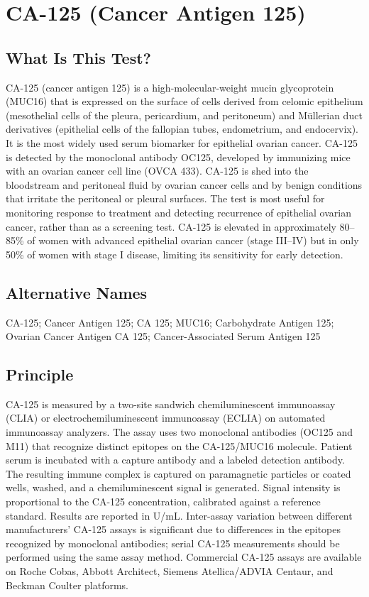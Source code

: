 \chapter{CA-125 (Cancer Antigen 125)}

\section*{What Is This Test?}
CA-125 (cancer antigen 125) is a high-molecular-weight mucin glycoprotein (MUC16) that is expressed on the surface of cells derived from celomic epithelium (mesothelial cells of the pleura, pericardium, and peritoneum) and M\"ullerian duct derivatives (epithelial cells of the fallopian tubes, endometrium, and endocervix). It is the most widely used serum biomarker for epithelial ovarian cancer. CA-125 is detected by the monoclonal antibody OC125, developed by immunizing mice with an ovarian cancer cell line (OVCA 433). CA-125 is shed into the bloodstream and peritoneal fluid by ovarian cancer cells and by benign conditions that irritate the peritoneal or pleural surfaces. The test is most useful for monitoring response to treatment and detecting recurrence of epithelial ovarian cancer, rather than as a screening test. CA-125 is elevated in approximately 80--85\% of women with advanced epithelial ovarian cancer (stage III--IV) but in only 50\% of women with stage I disease, limiting its sensitivity for early detection.

\section*{Alternative Names}
CA-125; Cancer Antigen 125; CA 125; MUC16; Carbohydrate Antigen 125; Ovarian Cancer Antigen CA 125; Cancer-Associated Serum Antigen 125

\section*{Principle}
CA-125 is measured by a two-site sandwich chemiluminescent immunoassay (CLIA) or electrochemiluminescent immunoassay (ECLIA) on automated immunoassay analyzers. The assay uses two monoclonal antibodies (OC125 and M11) that recognize distinct epitopes on the CA-125/MUC16 molecule. Patient serum is incubated with a capture antibody and a labeled detection antibody. The resulting immune complex is captured on paramagnetic particles or coated wells, washed, and a chemiluminescent signal is generated. Signal intensity is proportional to the CA-125 concentration, calibrated against a reference standard. Results are reported in U/mL. Inter-assay variation between different manufacturers' CA-125 assays is significant due to differences in the epitopes recognized by monoclonal antibodies; serial CA-125 measurements should be performed using the same assay method. Commercial CA-125 assays are available on Roche Cobas, Abbott Architect, Siemens Atellica/ADVIA Centaur, and Beckman Coulter platforms.

